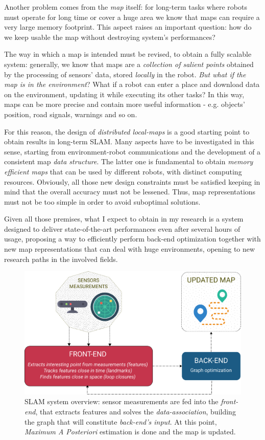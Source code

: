 \documentclass[10pt,a4paper, notitlepage]{report}
\begin{document}
Another problem comes from the \textit{map} itself: for long-term tasks where robots must operate for long time or cover a huge area we know that maps can require a very large memory footprint. This aspect raises an important question: how do we keep usable the map without destroying system's performances? 

The way in which a map is intended must be revised, to obtain a fully scalable system: generally, we know that maps are a \textit{collection of salient points} obtained by the processing of sensors' data, stored \textit{locally} in the robot. \textit{But what if the map is in the environment}? What if a robot can enter a place and download data on the environment, updating it while executing its other tasks? In this way, maps can be more precise and contain more useful information - e.g. objects' position, road signals, warnings and so on. 

For this reason, the design of \textit{distributed local-maps} is a good starting point to obtain results in long-term SLAM. Many aspects have to be investigated in this sense, starting from environment-robot communications and the development of a consistent map \textit{data structure}. The latter one is fundamental to obtain \textit{memory efficient maps} that can be used by different robots, with distinct computing resources. Obviously, all those new design constraints must be satisfied keeping in mind that the overall accuracy must not be lessened. Thus, map representations must not be too simple in order to avoid suboptimal solutions.

\vspace{15px}

Given all those premises, what I expect to obtain in my research is a system designed to deliver state-of-the-art performances even after several hours of usage, proposing a way to efficiently perform back-end optimization together with new map representations that can deal with huge environments, opening to new research paths in the involved fields.

\begin{figure}
    \centering
    \includegraphics[width=0.9\linewidth]{media/slam_system_mod.png}
    \caption{SLAM system overview: sensor measurements are fed into the \textit{front-end}, that extracts features and solves the \textit{data-association}, building the graph that will constitute \textit{back-end's input}. At this point, \textit{Maximum A Posteriori} estimation is done and the map is updated.}
    \label{fig:slam-overview}
\end{figure}
\end{document}
